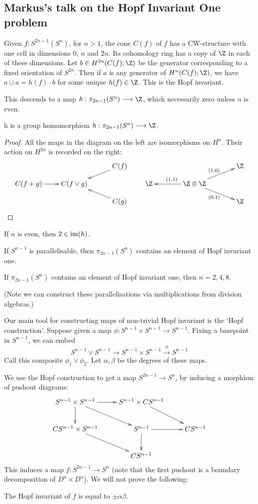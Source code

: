 \documentclass[11pt]{article}
\newcommand{\KanSemResponse}[1]
{
\thispagestyle{fancy}
\subsection*{#1}
}
\begin{document}
\begin{MarkusHopfInvOne}
\KanSemResponse
{Markus's talk on the Hopf Invariant One problem}
Given $f:S^{2n-1}(S^n)$, for $n>1$, the cone $C(f)$ of $f$ has a CW-structure with one cell in dimensions 0, $n$ and $2n$. Its cohomology ring has a copy of $\Z$ in each of these dimensions. Let $b\in H^{2n}(C(f);\Z)$ be the generator corresponding to a fixed orientation of $S^{2n}$. Then if $a$ is any generator of $H^{n}(C(f);\Z)$, we have $a\cup a=h(f)\cdot b$ for some unique $h(f)\in\Z$. This is the Hopf invariant.

This descends to a map $h:\pi_{2n-1}(S^n)\to\Z$, which necessarily zero unless $n$ is even.
\begin{lem*}
h is a group homomorphism $h:\pi_{2n-1}(S^n)\to\Z$.
\end{lem*}
\begin{proof} All the maps in the diagram on the left are isomorphisms on $H^n$. Their action on $H^{2n}$ is recorded on the right:
\[\xymatrix@!0@R=.9cm@C=2.3cm{
&&C(f)\ar[ld]\\
C(f+g)\ar[r]&C(f\vee g)\\
&&C(g)\ar[lu]
}\qquad\xymatrix@!0@R=.9cm@C=2.3cm{
&&\Z\ar[ld];[]^{(1,0)}\\
\Z\ar[r];[]_{(1,1)}&\Z\oplus\Z\\
&&\Z\ar[lu];[]_{(0,1)}
}\]
\end{proof}
\begin{prop*}
If $n$ is even, then $2\in\operatorname{im}(h)$.
\end{prop*}
\begin{prop*}
If $S^{n-1}$ is parallelisable, then $\pi_{2n-1}(S^n)$ contains an element of Hopf invariant one.
\end{prop*}
\begin{thm*}
If $\pi_{2n-1}(S^n)$ contains an element of Hopf invariant one, then $n=2,4,8$.
\end{thm*}
\noindent (Note we can construct these parallelisations via multiplications from division algebras.)

Our main tool for constructing maps of non-trivial Hopf invariant is the `Hopf construction'. Suppose given a map $\phi:S^{n-1}\times S^{n-1}\to S^{n-1}$. Fixing a basepoint in $S^{n-1}$, we can embed
\[S^{n-1}\vee S^{n-1}\to S^{n-1}\times S^{n-1}\overset{\phi}{\to} S^{n-1}\]
Call this composite $\phi_1\vee\phi_2$. Let $\alpha,\beta$ be the degrees of these maps.

We use the Hopf construction to get a map $S^{2n-1}\to S^n$, by inducing a morphism of pushout diagrams:
\[\xymatrix{%
S^{n-1}\times S^{n-1}\ar[r]\ar[d]\ar[rd]&S^{n-1}\times CS^{n-1}\ar[rd]\\
CS^{n-1}\times S^{n-1}\ar[rd]&S^{n-1}\ar[r]\ar[d]&CS^{n-1}\\
&CS^{n-1}
}\]
This induces a map $f:S^{2n-1}\to S^n$ (note that the first pushout is a boundary decomposition of $D^n\times D^n$). We will not prove the following:
\begin{prop*}
The Hopf invariant of $f$ is equal to $\pm\alpha\beta$.
\end{prop*}


\end{MarkusHopfInvOne}
\end{document}
